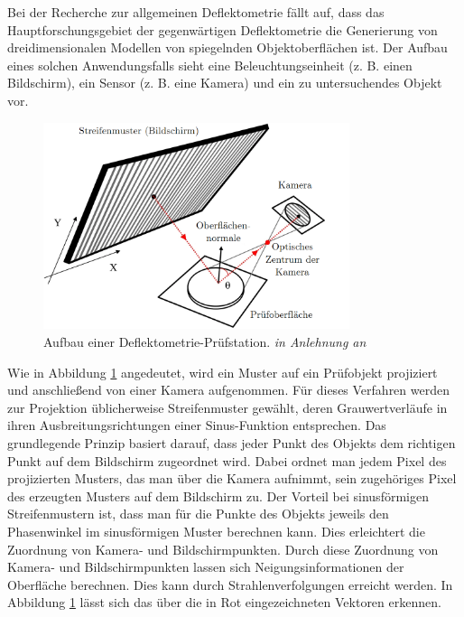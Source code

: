 Bei der Recherche zur allgemeinen Deflektometrie fällt auf, dass das Hauptforschungsgebiet der gegenwärtigen Deflektometrie die Generierung von dreidimensionalen Modellen von spiegelnden Objektoberflächen ist.
Der Aufbau eines solchen Anwendungsfalls sieht eine Beleuchtungseinheit (z. B. einen Bildschirm), ein Sensor (z. B. eine Kamera) und ein zu untersuchendes Objekt vor.

\begin{figure}[H]
	\centering
	\includegraphics[width=0.8\textwidth]{02_grundlagenZurDeflektometrie/rekonstruktion/figures/nature-articel-nr1}
	\caption[Aufbau einer Deflektometrie-Prüfstation]{Aufbau einer Deflektometrie-Prüfstation. \textit{in Anlehnung an} \cite{aufbau}}
	\label{img:aufbau}
\end{figure}

\noindent
Wie in Abbildung \ref{img:aufbau} angedeutet, wird ein Muster auf ein Prüfobjekt projiziert und anschließend von einer Kamera aufgenommen.
Für dieses Verfahren werden zur Projektion üblicherweise Streifenmuster ge\-wählt, deren Grauwertverläufe in ihren Ausbreitungsrichtungen einer Sinus-Funktion entsprechen.
Das grundlegende Prinzip basiert darauf, dass jeder Punkt des Objekts dem richtigen Punkt auf dem Bildschirm zugeordnet wird.
Dabei ordnet man jedem Pixel des projizierten Musters, das man über die Kamera aufnimmt, sein zugehöriges Pixel des erzeugten Musters auf dem Bildschirm zu.
Der Vorteil bei sinusförmigen Streifenmustern ist, dass man für die Punkte des Objekts jeweils den Phasenwinkel im sinusförmigen Muster berechnen kann.
Dies erleichtert die Zuordnung von Kamera- und Bildschirmpunkten.
Durch diese Zuordnung von Kamera- und Bildschirmpunkten lassen sich Neigungsinformationen der Oberfläche berechnen.
Dies kann durch Strahlenverfolgungen erreicht werden.
In Abbildung \ref{img:aufbau} lässt sich das über die in Rot eingezeichneten Vektoren erkennen.

